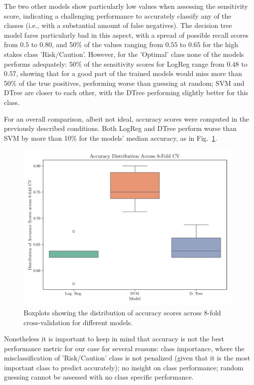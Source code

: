 \documentclass[conference]{IEEEtran}
\begin{document}
The two other models show particularly low values when assessing the sensitivity score, indicating a challenging performance to accurately classify any of the classes (i.e., with a substantial amount of false negatives). The decision tree model fares particularly bad in this aspect, with a spread of possible recall scores from $0.5$ to $0.80$, and 50\% of the values ranging from $0.55$ to $0.65$ for the high stakes class 'Risk/Caution'. However, for the 'Optimal' class none of the models performs adequately: 50\% of the sensitivity scores for LogReg range from $0.48$ to $0.57$, showing that for a good part of the trained models would miss more than 50\% of the true positives, performing worse than guessing at random; SVM and DTree are closer to each other, with the DTree performing slightly better for this class.

For an overall comparison, albeit not ideal,  accuracy scores were computed in the previously described conditions. Both LogReg and DTree perform worse than SVM by more than 10\% for the models' median accuracy, as in Fig.~\ref{box_accuracy}. 

\begin{figure}[H]
    \centering
    \includegraphics[width=1\linewidth]{assets/box_accuracy.png}
    \caption{Boxplots showing the distribution of accuracy scores across 8-fold cross-validation for different models.}
    \label{box_accuracy}
\end{figure} %

Nonetheless it is important to keep in mind that accuracy is not the best performance metric for our case for several reasons: class importance, where the misclassification of 'Risk/Caution' class is not penalized (given that it is the most important class to predict accurately); no insight on class performance; random guessing cannot be assessed with no class specific performance.
\end{document}
